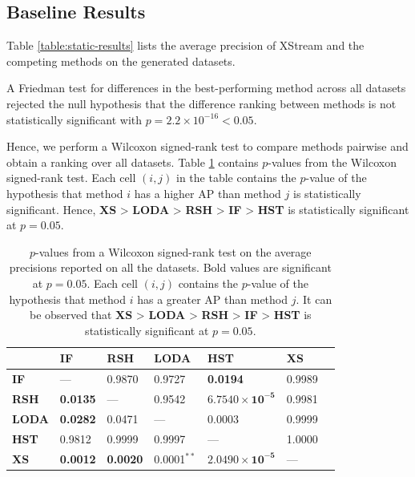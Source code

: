 \subsection{Baseline Results}

Table \ref{table:static-results} lists the average precision of XStream and the competing methods on the generated datasets.

A Friedman test for differences in the best-performing method across all datasets rejected the null hypothesis that the difference ranking between methods is not statistically significant with $p=2.2\times10^{-16} < 0.05$.

Hence, we perform a Wilcoxon signed-rank test to compare methods pairwise and obtain a ranking over all datasets. Table \ref{table:wilcoxon-all} contains $p$-values from the Wilcoxon signed-rank test. Each cell $(i,j)$ in the table contains the $p$-value of the hypothesis that method $i$ has a higher AP than method $j$ is statistically significant. Hence, \textbf{XS} > \textbf{LODA} > \textbf{RSH} > \textbf{IF} > \textbf{HST} is statistically significant at $p=0.05$.
\begin{table}[h!]
		\centering
    \begin{tabular}{lllllll}
    \toprule
    ~        & \textbf{IF}   & \textbf{RSH}    & \textbf{LODA}      & \textbf{HST}  & \textbf{XS} \\
		\midrule
    \textbf{IF}  	 & ---       			& 0.9870    		& 0.9727   			& \textbf{0.0194}   						& 0.9989       \\
    \textbf{RSH}   & \textbf{0.0135} 	& ---       		& 0.9542   			& $\pmb{6.7540\times10^{-5}}$ & 0.9981       \\
    \textbf{LODA}  & \textbf{0.0282} 	& 0.0471    		& ---      			& 0.0003   							& 0.9999      \\
    \textbf{HST} 	 & 0.9812    			& 0.9999    		& 0.9997   			& ---         					& 1.0000       \\
    \textbf{XS}    & \textbf{0.0012} & \textbf{0.0020} & 0.0001$^{**}$ & $\pmb{2.0490\times10^{-5}}$  & ---       \\
		\bottomrule
    \end{tabular}
    \caption{$p$-values from a Wilcoxon signed-rank test on the average precisions reported on all the datasets. Bold values are significant at $p=0.05$. Each cell $(i,j)$ contains the $p$-value of the hypothesis that method $i$ has a greater AP than method $j$. It can be observed that \textbf{XS} > \textbf{LODA} > \textbf{RSH} > \textbf{IF} > \textbf{HST} is statistically significant at $p=0.05$.}
		\label{table:wilcoxon-all}
\end{table}

